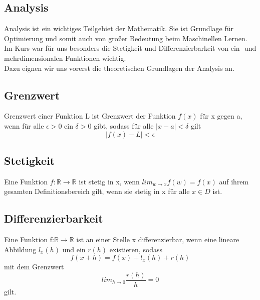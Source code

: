 \documentclass{article}
\begin{document}
\begin{multicols}{2}
\section{Analysis}
  

Analysis ist ein wichtiges Teilgebiet der Mathematik. Sie ist Grundlage für Optimierung und somit auch von großer Bedeutung beim Maschinellen Lernen. \\
Im Kurs war für uns besonders die Stetigkeit und Differenzierbarkeit von ein- und mehrdimensionalen Funktionen wichtig. \\
Dazu eignen wir uns vorerst die theoretischen Grundlagen der Analysis an. \\

\subsection{Grenzwert}
Grenzwert einer Funktion L ist Grenzwert der Funktion $f(x)$ für x gegen a, wenn für alle $\epsilon > 0$ ein $\delta > 0$ gibt, sodass für alle $|x-a| < \delta$ gilt \begin{equation*}|f(x)-L|<\epsilon\end{equation*}

\subsection{Stetigkeit}
Eine Funktion $f:\mathds{R}\rightarrow \mathds{R}$ ist stetig in x, wenn $lim_{w\rightarrow x}f(w)=f(x)$ auf ihrem gesamten Definitionsbereich gilt, wenn sie stetig in x für alle $x\in D$ ist.

\subsection{Differenzierbarkeit}
Eine Funktion f:$\mathds{R}\rightarrow\mathds{R}$ ist an einer Stelle x differenzierbar, wenn eine lineare Abbildung $ l_ x (h)$ und ein $r(h)$ existieren, sodass \begin{equation*}f(x+h)=f(x)+l_{x}(h)+r(h)\end{equation*} mit dem Grenzwert \begin{equation*}lim_{h\rightarrow 0} \frac{r(h)}{h}= 0\end{equation*}gilt.


\end{multicols}
\end{document}
